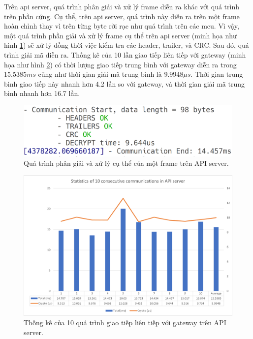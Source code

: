 Trên \acrshort{api} server, quá trình phân giải và xử lý frame diễn ra khác với quá trình trên phần cứng. Cụ thể, trên \acrshort{api} server, quá trình này diễn ra trên một frame hoàn chỉnh thay vì trên từng byte rời rạc như quá trình trên các \acrshort{mcu}. Vì vậy, một quá trình phần giải và xử lý frame cụ thể trên \acrshort{api} server (minh họa như hình \ref{fig:frame-parsing-process-api-server}) sẽ xử lý đồng thời việc kiểm tra các header, trailer, và CRC. Sau đó, quá trình giải mã diễn ra. Thống kê của 10 lần giao tiếp liên tiếp với gateway (minh họa như hình \ref{fig:10-measure-commu-server}) có thời lượng giao tiếp trung bình với gateway diễn ra trong $15.5385ms$ cũng như thời gian giải mã trung bình là $9.9948\mu s$. Thời gian trung bình giao tiếp này nhanh hơn 4.2 lần so với gateway, và thời gian giải mã trung bình nhanh hơn 16.7 lần.

\begin{figure}[htp]
\centering
\captionsetup{justification=centering}
\includegraphics[width=1.0\linewidth, frame]{images/fig-frame-parsing-process-api-server.png}
\caption{Quá trình phân giải và xử lý cụ thể của một frame trên API server.}
\label{fig:frame-parsing-process-api-server}
\end{figure}

\begin{figure}[htp]
\centering
\captionsetup{justification=centering}
\includegraphics[width=1.0\linewidth, frame]{images/fig-10-measure-commu-server.png}
\caption{Thống kế của 10 quá trình giao tiếp liên tiếp với gateway trên API server.}
\label{fig:10-measure-commu-server}
\end{figure}


